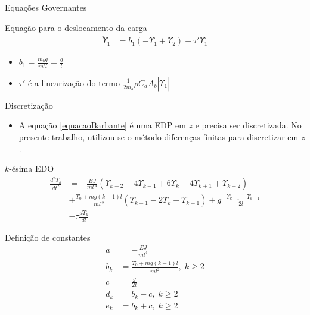 \documentclass[10pt]{beamer}
\begin{document}
\begin{frame}[fragile]{Equações Governantes}
\begin{block}{Equação para o deslocamento da carga}
	\begin{align}
 	\ddot{\Upsilon}_1 &= b_1\left(-\Upsilon_1 + \Upsilon_2\right) - \tau'\dot{\Upsilon}_1\label{upsilon1final}
 \end{align}
\end{block}

\begin{itemize}
	\item $b_1 = \frac{m_b g}{m'l} = \frac{g}{l}$
	\item $\tau'$ é a linearização do termo $\frac{1}{2m_b}\rho C_d A_b \left|\dot{\Upsilon}_1\right|$
\end{itemize}
	
\end{frame}

\begin{frame}[fragile]{Discretização}

\begin{block}{}
\begin{itemize}
	\item A equação \ref{equacaoBarbante} é uma EDP em $z$ e precisa ser discretizada. No presente trabalho, utilizou-se o método diferenças finitas para discretizar em $z$.
\end{itemize}
\end{block}

\begin{block}{$k$-ésima EDO}
\begin{align}
	\frac{d^2\Upsilon_k}{dt^2} &= -\frac{EJ}{m l\,^4}\left(\Upsilon_{k-2} - 4\Upsilon_{k-1}+6\Upsilon_{k}-4\Upsilon_{k+1}+\Upsilon_{k+2}\right)\nonumber\\
	&+ \frac{T_0+mg(k-1)l}{m l\,^2}\left(\Upsilon_{k-1}-2\Upsilon_{k} + \Upsilon_{k+1}\right)+g\frac{-\Upsilon_{k-1}+\Upsilon_{k+1}}{2l}\nonumber\\
	&-\tau\frac{d\Upsilon_k}{dt}
\end{align}
\end{block}
\end{frame}

\begin{frame}[fragile]{Definição de constantes}
\begin{align}
	a &= -\frac{EJ}{m l^4}\\
	b_k &= \frac{T_0 + mg(k-1)l}{m l^2},\; k\ge 2\\
	c &= \frac{g}{2l}\\
	d_k &= b_k - c,\; k\ge 2\\
	e_k &= b_k + c,\; k\ge 2
\end{align}	
\end{frame}
\end{document}
